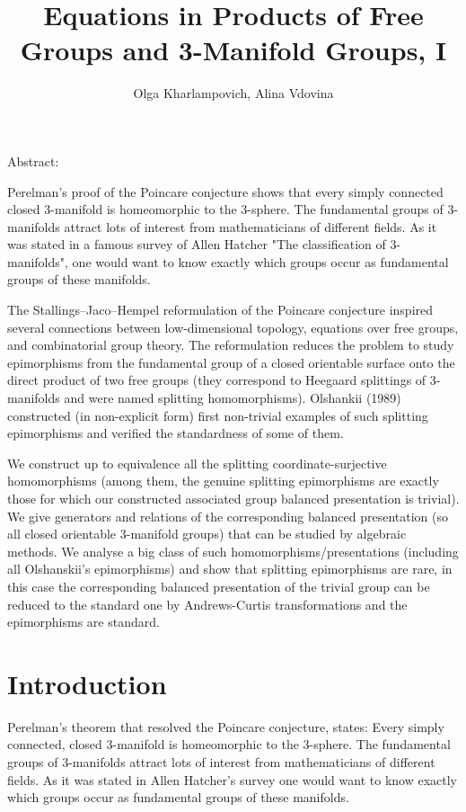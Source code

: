 \documentclass{article}
\begin{document}
\title{Equations in Products of Free Groups and 3-Manifold Groups, I}

\author{Olga Kharlampovich, Alina Vdovina}




\maketitle

 Abstract:

Perelman's proof of the Poincare conjecture shows that every simply
connected closed 3-manifold is homeomorphic to the 3-sphere. The fundamental groups of 3-manifolds attract lots of interest from mathematicians of different fields. As it was stated in a famous survey of Allen Hatcher  "The classification of 3-manifolds", one would want to know exactly which groups occur as fundamental groups of these manifolds. 

The Stallings--Jaco--Hempel reformulation of the Poincare conjecture
inspired several connections between low-dimensional topology, equations
over free groups, and combinatorial group theory. The reformulation reduces the problem to study epimorphisms from the fundamental group of a closed orientable surface onto the direct product of two free groups (they correspond to Heegaard splittings of 3-manifolds and were named splitting homomorphisms).  Olshankii (1989) constructed (in non-explicit form) first non-trivial examples of such splitting epimorphisms  and verified 
 the standardness of some of them.  
 

 We construct up to equivalence all the splitting coordinate-surjective homomorphisms (among them, the genuine splitting epimorphisms are exactly those for which  our constructed associated group balanced presentation is trivial).  We give generators and relations of the corresponding  balanced presentation (so all closed orientable 3-manifold groups) that can be studied by algebraic
methods.  We analyse a big class of such homomorphisms/presentations (including all Olshanskii's epimorphisms)
and show that splitting epimorphisms are  rare, in this case the corresponding balanced presentation of the trivial group can be reduced to the standard one  by Andrews-Curtis transformations and  the epimorphisms  are standard.  

 



\tableofcontents

\section{Introduction} 
Perelman's theorem that resolved the Poincare conjecture, states: Every simply connected, closed 3-manifold is homeomorphic to the 3-sphere. The fundamental groups of 3-manifolds attract lots of interest from mathematicians of different fields. As it was stated in  Allen Hatcher's survey  \cite{Hat}  one would want to know exactly which groups occur as fundamental groups of these manifolds. 
\end{document}
